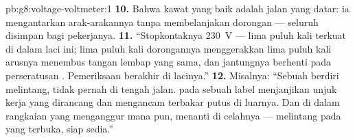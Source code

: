 \begin{solution}{pb:g8:voltage-voltmeter:1}
\textbf{10.} Bahwa kawat yang baik adalah jalan yang datar: ia
mengantarkan arak-arakannya tanpa membelanjakan dorongan --- seluruh
 disimpan bagi pekerjanya.
\textbf{11.} ``Stopkontaknya \qty{230}{V} --- lima puluh kali 
terkuat di dalam laci ini; lima puluh kali dorongannya menggerakkan
lima puluh kali arusnya menembus tangan lembap yang sama, dan
jantungnya berhenti pada perseratusan . Pemeriksaan berakhir di
lacinya.''
\textbf{12.} Misalnya: ``Sebuah  berdiri melintang, tidak
pernah di tengah jalan.  pada sebuah label menjanjikan
unjuk kerja yang dirancang dan mengancam terbakar putus di luarnya.
Dan di dalam rangkaian yang menganggur mana pun,  menanti
di celahnya --- melintang pada  yang terbuka, siap sedia.''
\end{solution}
